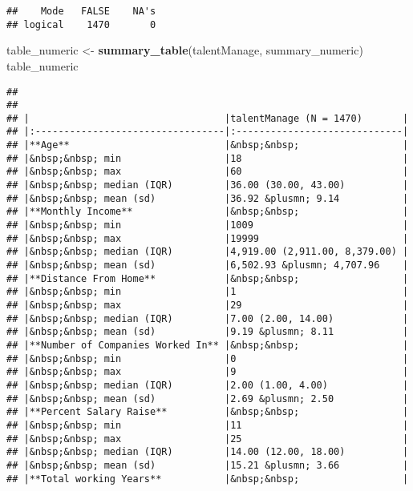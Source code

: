 \documentclass[]{article}
\newenvironment{Shaded}{\begin{snugshade}}{\end{snugshade}}
\newcommand{\KeywordTok}[1]{\textcolor[rgb]{0.13,0.29,0.53}{\textbf{{#1}}}}
\newcommand{\StringTok}[1]{\textcolor[rgb]{0.31,0.60,0.02}{{#1}}}
\newcommand{\NormalTok}[1]{{#1}}
\begin{document}
\begin{verbatim}
##    Mode   FALSE    NA's 
## logical    1470       0
\end{verbatim}

\begin{Shaded}
\begin{Highlighting}[]
\NormalTok{table_numeric <-}\StringTok{ }\KeywordTok{summary_table}\NormalTok{(talentManage, summary_numeric)}
\NormalTok{table_numeric}
\end{Highlighting}
\end{Shaded}

\begin{verbatim}
## 
## 
## |                                  |talentManage (N = 1470)       |
## |:---------------------------------|:-----------------------------|
## |**Age**                           |&nbsp;&nbsp;                  |
## |&nbsp;&nbsp; min                  |18                            |
## |&nbsp;&nbsp; max                  |60                            |
## |&nbsp;&nbsp; median (IQR)         |36.00 (30.00, 43.00)          |
## |&nbsp;&nbsp; mean (sd)            |36.92 &plusmn; 9.14           |
## |**Monthly Income**                |&nbsp;&nbsp;                  |
## |&nbsp;&nbsp; min                  |1009                          |
## |&nbsp;&nbsp; max                  |19999                         |
## |&nbsp;&nbsp; median (IQR)         |4,919.00 (2,911.00, 8,379.00) |
## |&nbsp;&nbsp; mean (sd)            |6,502.93 &plusmn; 4,707.96    |
## |**Distance From Home**            |&nbsp;&nbsp;                  |
## |&nbsp;&nbsp; min                  |1                             |
## |&nbsp;&nbsp; max                  |29                            |
## |&nbsp;&nbsp; median (IQR)         |7.00 (2.00, 14.00)            |
## |&nbsp;&nbsp; mean (sd)            |9.19 &plusmn; 8.11            |
## |**Number of Companies Worked In** |&nbsp;&nbsp;                  |
## |&nbsp;&nbsp; min                  |0                             |
## |&nbsp;&nbsp; max                  |9                             |
## |&nbsp;&nbsp; median (IQR)         |2.00 (1.00, 4.00)             |
## |&nbsp;&nbsp; mean (sd)            |2.69 &plusmn; 2.50            |
## |**Percent Salary Raise**          |&nbsp;&nbsp;                  |
## |&nbsp;&nbsp; min                  |11                            |
## |&nbsp;&nbsp; max                  |25                            |
## |&nbsp;&nbsp; median (IQR)         |14.00 (12.00, 18.00)          |
## |&nbsp;&nbsp; mean (sd)            |15.21 &plusmn; 3.66           |
## |**Total working Years**           |&nbsp;&nbsp;                  |

\end{verbatim}
\end{document}
